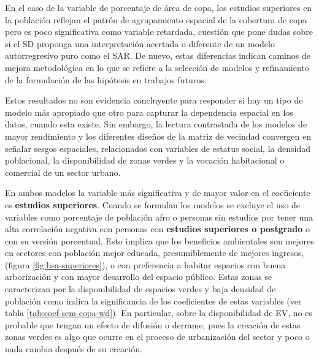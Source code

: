 \documentclass[12pt,a4paper,oneside, openany]{book}
\theoremstyle{definition}
\theoremstyle{definition}
\theoremstyle{definition}
\theoremstyle{remark}
\begin{document}
En el caso de la variable de porcentaje de área de copa, los estudios
superiores en la población reflejan el patrón de agrupamiento espacial
de la cobertura de copa pero es poco significativa como variable
retardada, cuestión que pone dudas sobre si el SD proponga una
interpretación acertada o diferente de un modelo autorregresivo puro
como el SAR. De nuevo, estas diferencias indican caminos de mejora
metodológica en lo que se refiere a la selección de modelos y
refinamiento de la formulación de las hipótesis en trabajos futuros.

Estos resultados no son evidencia concluyente para responder si hay un
tipo de modelo más apropiado que otro para capturar la dependencia
espacial en los datos, cuando esta existe. Sin embargo, la lectura
contrastada de los modelos de mayor rendimiento y los diferentes diseños
de la matriz de vecindad convergen en señalar sesgos espaciales,
relacionados con variables de estatus social, la densidad poblacional,
la disponibilidad de zonas verdes y la vocación habitacional o comercial
de un sector urbano.

En ambos modelos la variable más significativa y de mayor valor en el
coeficiente es \textbf{estudios superiores}. Cuando se formulan los
modelos se excluye el uso de variables como porcentaje de población afro
o personas sin estudios por tener una alta correlación negativa con
personas con \textbf{estudios superiores o postgrado} o con su versión
porcentual. Esto implica que los beneficios ambientales son mejores en
sectores con población mejor educada, presumiblemente de mejores
ingresos, (figura \ref{fig:lisa-superiores}), o con preferencia a
habitar espacios con buena arborización y con mayor desarrollo del
espacio público. Estas zonas se caracterizan por la disponibilidad de
espacios verdes y baja densidad de población como indica la
significancia de los coeficientes de estas variables (ver tabla
\ref{tab:coef-sem-copa-wd}). En particular, sobre la disponibilidad de
EV, no es probable que tengan un efecto de difusión o derrame, pues la
creación de estas zonas verdes es algo que ocurre en el proceso de
urbanización del sector y poco o nada cambia después de su creación.
\end{document}
